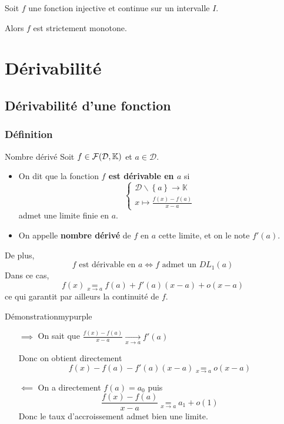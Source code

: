     \begin{lem}{}{}
        Soit $f$ une fonction injective et continue sur un intervalle $I$.
    
        Alors $f$ est strictement monotone.
    \end{lem}

\section{Dérivabilité}

\subsection{Dérivabilité d’une fonction}

    \subsubsection{Définition}

    \begin{defitheo}{Nombre dérivé}{}
        Soit $f \in \mathcal{F}(\mathcal{D},\mathbb{K})$ et $a \in \mathcal{D}$.
        \begin{itemize}
            \item On dit que la fonction \textbf{$f$ est dérivable en $a$} si 
            \[ \left\{ \begin{array}{ll}
                \mathcal{D}\backslash\left\{a\right\} \rightarrow \mathbb{K} \\
                x \mapsto \frac{f(x) - f(a)}{x-a}
            \end{array} \right. \] admet une limite finie en $a$.
            \item On appelle \textbf{nombre dérivé} de $f$ en $a$ cette limite, et on le note $f'(a)$.
        \end{itemize}
        De plus, 
        \[ f \text{ est dérivable en } a \iff f \text{ admet un } DL_1(a) \]
        Dans ce cas, 
        \[ f(x) \underset{x \rightarrow a}{=} f(a) + f'(a)(x-a) + o(x-a) \]
        ce qui garantit par ailleurs la continuité de $f$.
        
    \end{defitheo}

    \begin{demo}{Démonstration}{mypurple}
        \begin{itemize}
            \item[\textcolor{mypurple}{$\implies$}] On sait que $\frac{f(x)-f(a)}{x-a} \underset{x \rightarrow a}{\longrightarrow} f'(a)$
            
            Donc on obtient directement \[ f(x) - f(a) - f'(a)(x-a) \underset{x \rightarrow a}{=} o(x-a) \] 
            \item[\textcolor{mypurple}{$\impliedby$}] On a directement $f(a) = a_0$ puis \[ \frac{f(x)-f(a)}{x-a} \underset{x \rightarrow a}{=} a_1 + o(1) \] 
            Donc le taux d’accroissement admet bien une limite.
        \end{itemize}
    \end{demo}


